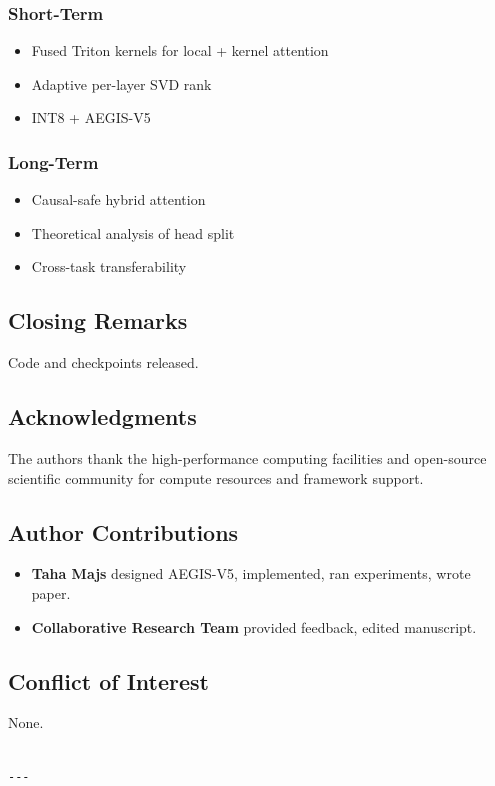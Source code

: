 \subsubsection{Short-Term}
\begin{itemize}
\item Fused Triton kernels for local + kernel attention
\item Adaptive per-layer SVD rank
\item INT8 + AEGIS-V5

\end{itemize}
\subsubsection{Long-Term}
\begin{itemize}
\item Causal-safe hybrid attention
\item Theoretical analysis of head split
\item Cross-task transferability

\end{itemize}
\subsection{Closing Remarks}

Code and checkpoints released.

\subsection{Acknowledgments}

The authors thank the high-performance computing facilities and open-source scientific community for compute resources and framework support.

\subsection{Author Contributions}

\begin{itemize}
\item \textbf{Taha Majs} designed AEGIS-V5, implemented, ran experiments, wrote
  paper.
\item \textbf{Collaborative Research Team} provided feedback, edited manuscript.

\end{itemize}
\subsection{Conflict of Interest}

None.
\begin{lstlisting}

---
\end{lstlisting}